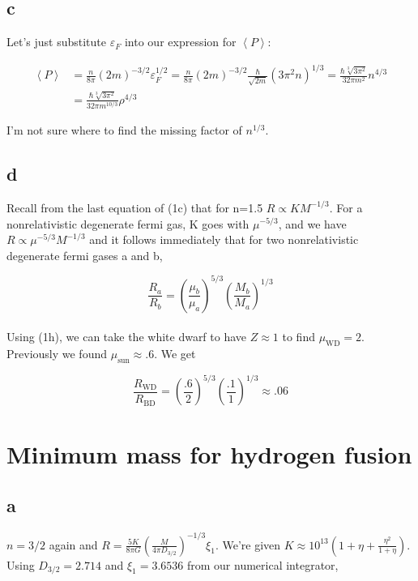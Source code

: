 \documentclass[12pt]{article}
\newcommand{\pfrac}[2]{\left(\frac{#1}{#2} \right)}
\newcommand{\ex}[1]{\left\langle#1\right\rangle}
\begin{document}
\subsection*{c}

Let's just substitute \(\varepsilon_F\) into our expression for \(\ex{P}\):

\begin{align*}
\ex{P} &= \frac{n}{8\pi}(2m)^{-3/2}\varepsilon_F^{1/2} = \frac{n}{8\pi}(2m)^{-3/2}\frac{\hbar}{\sqrt{2m}}(3\pi^2n)^{1/3} = \frac{\hbar\sqrt[3]{3\pi^2}}{32\pi m^2}n^{4/3} \\
&= \frac{\hbar\sqrt[3]{3\pi^2}}{32\pi m^{10/3}}\rho^{4/3}
\end{align*}

I'm not sure where to find the missing factor of \(n^{1/3}\).

\subsection*{d}

Recall from the last equation of (1c) that for n=1.5 \( R \propto KM^{-1/3}\). For a nonrelativistic degenerate fermi gas, K goes with \(\mu^{-5/3}\), and we have \(R \propto \mu^{-5/3}M^{-1/3}\) and it follows immediately that for two nonrelativistic degenerate fermi gases a and b,

\[ \frac{R_a}{R_b} = \pfrac{\mu_b}{\mu_a}^{5/3}\pfrac{M_b}{M_a}^{1/3}
\]\\

Using (1h), we can take the white dwarf to have \(Z\approx 1\) to find \(\mu_{\mathrm{WD}} = 2\). Previously we found \(\mu_{\mathrm{sun}} \approx .6\). We get 

\[ \frac{R_{\mathrm{WD}}}{R_{\mathrm{BD}}} = \pfrac{.6}{2}^{5/3} \pfrac{.1}{1}^{1/3} \approx .06
\]


\section{Minimum mass for hydrogen fusion}

\subsection*{a}


\(n=3/2\) again and \(R=\frac{5K}{8\pi G}\pfrac{M}{4\pi D_{3/2}}^{-1/3}\xi_1\). We're given \(K \approx 10^{13}\left( 1 + \eta + \frac{\eta^2}{1+\eta}\right)\). Using \(D_{3/2} = 2.714\) and \(\xi_1 = 3.6536\) from our numerical integrator,
\end{document}
